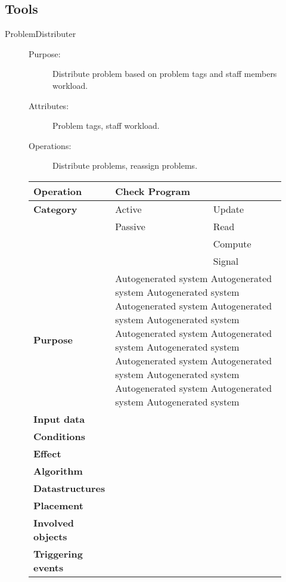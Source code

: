 \subsection{Tools}

\begin{description}
\item[ProblemDistributer]\hfill
\begin{description}
\item[Purpose:]Distribute problem based on problem tags and staff members workload.
\item[Attributes:]Problem tags, staff workload.
\item[Operations:]Distribute problems, reassign problems.
\end{description}
\end{description}

\begin{figure}
\begin{tabular}{p{3.5cm} p{4cm} p{4cm}}
\hline
\textbf{Operation}&Check Program\\
\hline
\textbf{Category}&\underline{ }Active&\underline{ }Update\\
&\underline{ }Passive&\underline{ }Read\\
&&\underline{ }Compute\\
&&\underline{ }Signal\\
\textbf{Purpose}&\multicolumn{2}{p{8cm}}{Autogenerated system Autogenerated system Autogenerated system Autogenerated system Autogenerated system Autogenerated system
Autogenerated system Autogenerated system Autogenerated system Autogenerated system Autogenerated system Autogenerated system 
Autogenerated system Autogenerated system Autogenerated system}\\
\textbf{Input data}&\multicolumn{2}{p{8cm}}{}\\
\textbf{Conditions}&\multicolumn{2}{p{8cm}}{}\\
\textbf{Effect}&\multicolumn{2}{p{8cm}}{}\\
\textbf{Algorithm}&\multicolumn{2}{p{8cm}}{}\\
\textbf{Datastructures}&\multicolumn{2}{p{8cm}}{}\\
\textbf{Placement}&\multicolumn{2}{p{8cm}}{}\\
\textbf{Involved objects}&\multicolumn{2}{p{8cm}}{}\\
\textbf{Triggering events}&\multicolumn{2}{p{8cm}}{}\\
\hline
\end{tabular}
\end{figure}

